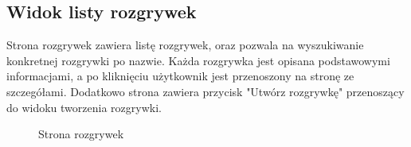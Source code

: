 \documentclass[shortabstract]{iithesis}
\begin{document}
\subsection{Widok listy rozgrywek}
Strona rozgrywek zawiera listę rozgrywek, oraz pozwala na wyszukiwanie konkretnej rozgrywki po nazwie.
Każda rozgrywka jest opisana podstawowymi informacjami, a po kliknięciu użytkownik jest przenoszony na stronę ze szczegółami.
Dodatkowo strona zawiera przycisk "Utwórz rozgrywkę" przenoszący do widoku tworzenia rozgrywki.


\begin{figure}[H]
    \centering
    \hfill
    \caption{Strona rozgrywek}
\end{figure}
\end{document}
